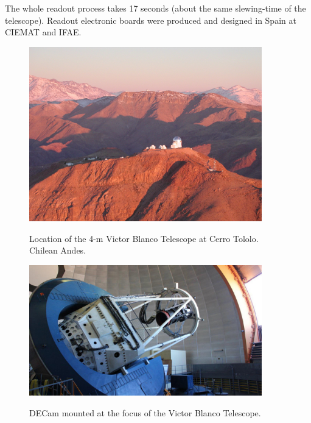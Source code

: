 The whole readout process takes 17 seconds (about the same slewing-time of the telescope). Readout electronic boards were produced and designed in Spain at CIEMAT and IFAE.
\begin{figure}
\begin{center}
\includegraphics[width=0.9\textwidth]{./Pictures/cerrotololo.jpg}
\caption{Location of the 4-m Victor Blanco Telescope at Cerro Tololo. Chilean Andes.}
\label{fig:cerrotololo}
\vspace{2cm}
\includegraphics[width=0.9\textwidth]{./Pictures/telescope_DES.jpg}
\caption{DECam mounted at the focus of the Victor Blanco Telescope.}
\label{fig:decam}
\end{center}
\end{figure}

